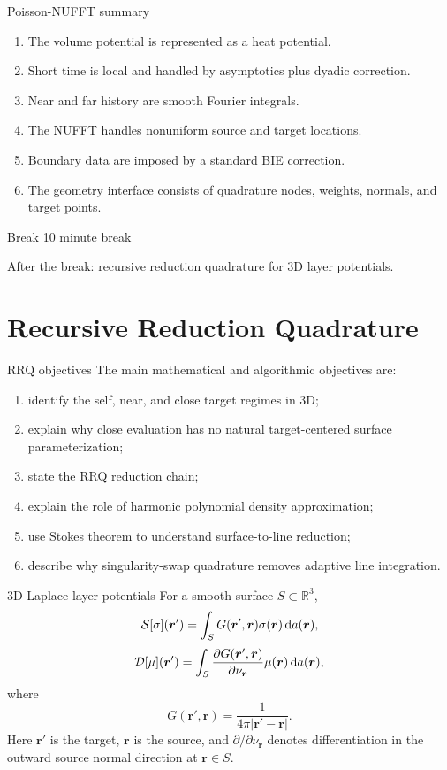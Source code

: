 \documentclass[aspectratio=169,11pt]{beamer}
\newcommand{\R}{\mathbb{R}}
\newcommand{\dd}{\,\mathrm d}
\newcommand{\rvec}{\bm{r}}
\newcommand{\rp}{\bm{r}'}
\begin{document}
\begin{frame}{Poisson-NUFFT summary}
\small
\begin{enumerate}
  \item The volume potential is represented as a heat potential.
  \item Short time is local and handled by asymptotics plus dyadic correction.
  \item Near and far history are smooth Fourier integrals.
  \item The NUFFT handles nonuniform source and target locations.
  \item Boundary data are imposed by a standard BIE correction.
  \item The geometry interface consists of quadrature nodes, weights, normals,
  and target points.
\end{enumerate}
\end{frame}

\begin{frame}{Break}
\centering
\Large
10 minute break

\vspace{6mm}
\normalsize
After the break: recursive reduction quadrature for 3D layer potentials.
\end{frame}

\section{Recursive Reduction Quadrature}

\begin{frame}{RRQ objectives}
\small
The main mathematical and algorithmic objectives are:
\begin{enumerate}
  \item identify the self, near, and close target regimes in 3D;
  \item explain why close evaluation has no natural target-centered surface
  parameterization;
  \item state the RRQ reduction chain;
  \item explain the role of harmonic polynomial density approximation;
  \item use Stokes theorem to understand surface-to-line reduction;
  \item describe why singularity-swap quadrature removes adaptive line integration.
\end{enumerate}
\end{frame}

\begin{frame}{3D Laplace layer potentials}
\small
For a smooth surface $S\subset\R^3$,
\[
  \Sop[\sigma](\rp)
  =
  \int_S G(\rp,\rvec)\sigma(\rvec)\dd a(\rvec),
\]
\[
  \Dop[\mu](\rp)
  =
  \int_S
  \frac{\partial G(\rp,\rvec)}{\partial \nu_{\rvec}}
  \mu(\rvec)\dd a(\rvec),
\]
where
\[
  G(\rp,\rvec)=\frac{1}{4\pi|\rp-\rvec|}.
\]
Here $\rp$ is the target, $\rvec$ is the source, and
$\partial/\partial\nu_{\rvec}$ denotes differentiation in the outward source
normal direction at $\rvec\in S$.
\end{frame}
\end{document}
